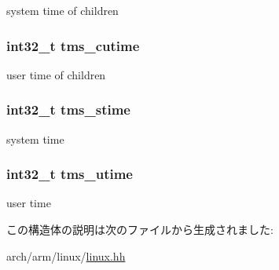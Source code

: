 system time of children \hypertarget{structArmLinux32_1_1tms_a1a6cb5b8afe4daa7206ed2483504f546}{
\subsubsection[{tms\_\-cutime}]{\setlength{\rightskip}{0pt plus 5cm}int32\_\-t {\bf tms\_\-cutime}}}
\label{structArmLinux32_1_1tms_a1a6cb5b8afe4daa7206ed2483504f546}


user time of children \hypertarget{structArmLinux32_1_1tms_a8538f2f33ab27e739791168aae55f252}{
\subsubsection[{tms\_\-stime}]{\setlength{\rightskip}{0pt plus 5cm}int32\_\-t {\bf tms\_\-stime}}}
\label{structArmLinux32_1_1tms_a8538f2f33ab27e739791168aae55f252}


system time \hypertarget{structArmLinux32_1_1tms_ab653476c9f49aba7c1c0a2b3bf0ea5bf}{
\subsubsection[{tms\_\-utime}]{\setlength{\rightskip}{0pt plus 5cm}int32\_\-t {\bf tms\_\-utime}}}
\label{structArmLinux32_1_1tms_ab653476c9f49aba7c1c0a2b3bf0ea5bf}


user time 

この構造体の説明は次のファイルから生成されました:\begin{DoxyCompactItemize}
\item 
arch/arm/linux/\hyperlink{arch_2arm_2linux_2linux_8hh}{linux.hh}\end{DoxyCompactItemize}
